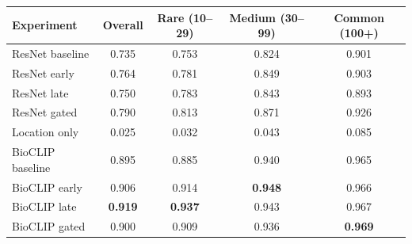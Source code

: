 \begin{tabular}{lcccc}
\toprule
Experiment & Overall & Rare (10--29) & Medium (30--99) & Common (100+) \\
\midrule
ResNet baseline & 0.735 & 0.753 & 0.824 & 0.901 \\
ResNet early & 0.764 & 0.781 & 0.849 & 0.903 \\
ResNet late & 0.750 & 0.783 & 0.843 & 0.893 \\
ResNet gated & 0.790 & 0.813 & 0.871 & 0.926 \\
Location only & 0.025 & 0.032 & 0.043 & 0.085 \\
BioCLIP baseline & 0.895 & 0.885 & 0.940 & 0.965 \\
BioCLIP early & 0.906 & 0.914 & \textbf{0.948} & 0.966 \\
BioCLIP late & \textbf{0.919} & \textbf{0.937} & 0.943 & 0.967 \\
BioCLIP gated & 0.900 & 0.909 & 0.936 & \textbf{0.969} \\
\bottomrule
\end{tabular}
